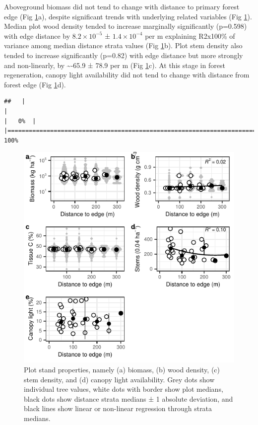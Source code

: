 \documentclass[
  12pt,
]{article}
\begin{document}
Aboveground biomass did not tend to change with distance to primary forest edge
(Fig \ref{fig:biomass}a), despite significant trends with underlying related variables
(Fig \ref{fig:biomass}).
Median plot wood density tended to increase marginally significantly
(p=0.598)
with edge distance by
\ensuremath{8.2\times 10^{-5}} ±
\ensuremath{1.4\times 10^{-4}} per m
explaining
R2x100\% of variance
among median distance strata values
(Fig \ref{fig:biomass}b).
Plot stem density also tended to increase significantly
(p=0.82)
with edge distance but more strongly and non-linearly, by
\textasciitilde-65.9 ±
78.9 per m
(Fig \ref{fig:biomass}c).
At this stage in forest regeneration, canopy light availability did not tend to change with distance from forest edge
(Fig \ref{fig:biomass}d).

\begin{verbatim}
##   |                                                                              |                                                                      |   0%  |                                                                              |======================================================================| 100%
\end{verbatim}

\begin{figure}
\centering
\includegraphics{merge_files/figure-latex/biomass-1.pdf}
\caption{\label{fig:biomass} Plot stand properties, namely (a) biomass, (b) wood density, (c) stem density, and (d) canopy light availability. Grey dots show individual tree values, white dots with border show plot medians, black dots show distance strata medians ± 1 absolute deviation, and black lines show linear or non-linear regression through strata medians.}
\end{figure}
\end{document}
